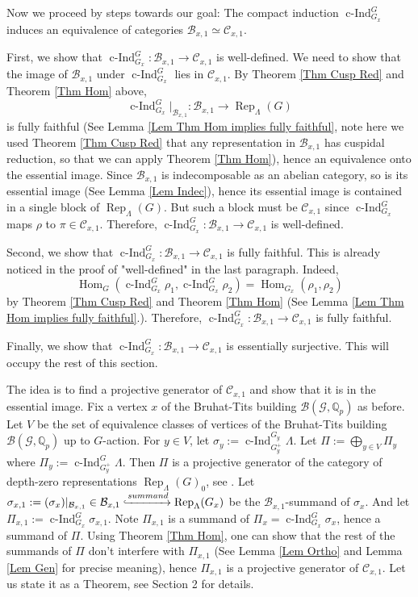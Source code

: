 \documentclass{article}
\DeclareMathOperator{\cInd}{\operatorname{c-Ind}}
\newcommand{\Hom}{\operatorname{Hom}}
\newcommand{\Rep}{\operatorname{Rep}}
\begin{document}
	Now we proceed by steps towards our goal: The compact induction $\cInd_{G_x}^G$ induces an equivalence of categories $\mathcal{B}_{x,1} \simeq \mathcal{C}_{x,1}$. 
	
	First, we show that $\cInd_{G_x}^G: \mathcal{B}_{x,1} \to \mathcal{C}_{x,1}$ is well-defined. We need to show that the image of $\mathcal{B}_{x,1}$ under $\cInd_{G_x}^G$ lies in $\mathcal{C}_{x,1}$. By Theorem \ref{Thm Cusp Red} and Theorem \ref{Thm Hom} above, $$\cInd_{G_x}^G|_{\mathcal{B}_{x,1}}: \mathcal{B}_{x,1} \to \Rep_{\Lambda}(G)$$
	is fully faithful (See Lemma \ref{Lem Thm Hom implies fully faithful}, note here we used Theorem \ref{Thm Cusp Red} that any representation in $\mathcal{B}_{x,1}$ has cuspidal reduction, so that we can apply Theorem \ref{Thm Hom}), hence an equivalence onto the essential image. Since $\mathcal{B}_{x,1}$ is indecomposable as an abelian category, so is its essential image (See Lemma \ref{Lem Indec}), hence its essential image is contained in a single block of $\Rep_{\Lambda}(G)$. But such a block must be $\mathcal{C}_{x,1}$ since $\cInd_{G_x}^G$ maps $\rho$ to $\pi \in \mathcal{C}_{x,1}$. Therefore, $\cInd_{G_x}^G: \mathcal{B}_{x,1} \to \mathcal{C}_{x,1}$ is well-defined.
	
	Second, we show that $\cInd_{G_x}^G: \mathcal{B}_{x,1} \to \mathcal{C}_{x,1}$ is fully faithful. This is already noticed in the proof of "well-defined" in the last paragraph. Indeed, 
	$$\Hom_G(\cInd_{G_x}^G\rho_1, \cInd_{G_x}^G\rho_2)=\Hom_{G_x}(\rho_1, \rho_2)$$
	by Theorem \ref{Thm Cusp Red} and Theorem \ref{Thm Hom} (See Lemma \ref{Lem Thm Hom implies fully faithful}.). Therefore, $\cInd_{G_x}^G: \mathcal{B}_{x,1} \to \mathcal{C}_{x,1}$ is fully faithful.
	
	Finally, we show that $\cInd_{G_x}^G: \mathcal{B}_{x,1} \to \mathcal{C}_{x,1}$ is essentially surjective. This will occupy the rest of this section. 
	
	The idea is to find a projective generator of $\mathcal{C}_{x,1}$ and show that it is in the essential image. Fix a vertex $x$ of the Bruhat-Tits building $\mathcal{B}(\mathcal{G}, \mathbb{Q}_p)$ as before. Let $V$ be the set of equivalence classes of vertices of the Bruhat-Tits building $\mathcal{B}(\mathcal{G}, \mathbb{Q}_p)$ up to $G$-action. For $y \in V$, let $\sigma_y:=\cInd_{G_y^+}^{G_y}\Lambda$. Let $\Pi:=\bigoplus_{y \in V}\Pi_y$ where $\Pi_y:=\cInd_{G_y^+}^G\Lambda$. Then $\Pi$ is a projective generator of the category of depth-zero representations $\Rep_{\Lambda}(G)_0$, see \cite[Appendix]{dat2009finitude}. Let $\sigma_{x,1}:=(\sigma_x)|_{\mathcal{B}_{x,1}} \in \mathcal{B}_{x,1} \xhookrightarrow{summand} \Rep_{\Lambda}(G_x)$ be the $\mathcal{B}_{x,1}$-summand of $\sigma_x$. And let $\Pi_{x,1}:=\cInd_{G_x}^G\sigma_{x,1}$. Note $\Pi_{x,1}$ is a summand of $\Pi_x=\cInd_{G_x}^G\sigma_x$, hence a summand of $\Pi$. Using Theorem \ref{Thm Hom}, one can show that the rest of the summands of $\Pi$ don't interfere with $\Pi_{x,1}$ (See Lemma \ref{Lem Ortho} and Lemma \ref{Lem Gen} for precise meaning), hence $\Pi_{x,1}$ is a projective generator of $\mathcal{C}_{x,1}$. Let us state it as a Theorem, see Section 2 for details.
	
\end{document}
